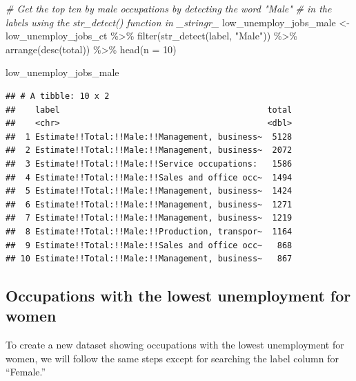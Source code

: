 \documentclass[
  krantz2]{krantz}
\makeatletter
\newenvironment{Shaded}{\begin{snugshade}}{\end{snugshade}}
\newcommand{\AttributeTok}[1]{\textcolor[rgb]{0.61,0.61,0.61}{#1}}
\newcommand{\CommentTok}[1]{\textcolor[rgb]{0.37,0.37,0.37}{\textit{#1}}}
\newcommand{\DecValTok}[1]{\textcolor[rgb]{0.06,0.06,0.06}{#1}}
\newcommand{\FunctionTok}[1]{\textcolor[rgb]{0,0,0}{#1}}
\newcommand{\NormalTok}[1]{#1}
\newcommand{\OtherTok}[1]{\textcolor[rgb]{0.37,0.37,0.37}{#1}}
\newcommand{\SpecialCharTok}[1]{\textcolor[rgb]{0,0,0}{#1}}
\newcommand{\StringTok}[1]{\textcolor[rgb]{0.5,0.5,0.5}{#1}}
\newenvironment{kframe}{%
\medskip{}
\setlength{\fboxsep}{.8em}
 \def\at@end@of@kframe{}%
 \ifinner\ifhmode%
  \def\at@end@of@kframe{\end{minipage}}%
  \begin{minipage}{\columnwidth}%
 \fi\fi%
 \def\FrameCommand##1{\hskip\@totalleftmargin \hskip-\fboxsep
 \colorbox{shadecolor}{##1}\hskip-\fboxsep
     \hskip-\linewidth \hskip-\@totalleftmargin \hskip\columnwidth}%
 \MakeFramed {\advance\hsize-\width
   \@totalleftmargin\z@ \linewidth\hsize
   \@setminipage}}%
 {\par\unskip\endMakeFramed%
 \at@end@of@kframe}
\renewenvironment{Shaded}{\begin{kframe}}{\end{kframe}}
\makeatother
\begin{document}
\begin{Shaded}
\begin{Highlighting}[]
\CommentTok{\# Get the top ten by male occupations by detecting the word "Male"}
\CommentTok{\# in the labels using the \textasciigrave{}str\_detect()\textasciigrave{} function in \_stringr\_}
\NormalTok{low\_unemploy\_jobs\_male }\OtherTok{\textless{}{-}}\NormalTok{ low\_unemploy\_jobs\_ct }\SpecialCharTok{\%\textgreater{}\%}
  \FunctionTok{filter}\NormalTok{(}\FunctionTok{str\_detect}\NormalTok{(label, }\StringTok{"Male"}\NormalTok{)) }\SpecialCharTok{\%\textgreater{}\%}
  \FunctionTok{arrange}\NormalTok{(}\FunctionTok{desc}\NormalTok{(total)) }\SpecialCharTok{\%\textgreater{}\%}
  \FunctionTok{head}\NormalTok{(}\AttributeTok{n =} \DecValTok{10}\NormalTok{)}

\NormalTok{low\_unemploy\_jobs\_male}
\end{Highlighting}
\end{Shaded}

\begin{verbatim}
## # A tibble: 10 x 2
##    label                                          total
##    <chr>                                          <dbl>
##  1 Estimate!!Total:!!Male:!!Management, business~  5128
##  2 Estimate!!Total:!!Male:!!Management, business~  2072
##  3 Estimate!!Total:!!Male:!!Service occupations:   1586
##  4 Estimate!!Total:!!Male:!!Sales and office occ~  1494
##  5 Estimate!!Total:!!Male:!!Management, business~  1424
##  6 Estimate!!Total:!!Male:!!Management, business~  1271
##  7 Estimate!!Total:!!Male:!!Management, business~  1219
##  8 Estimate!!Total:!!Male:!!Production, transpor~  1164
##  9 Estimate!!Total:!!Male:!!Sales and office occ~   868
## 10 Estimate!!Total:!!Male:!!Management, business~   867
\end{verbatim}

\hypertarget{occupations-with-the-lowest-unemployment-for-women}{%
\subsection{Occupations with the lowest unemployment for women}\label{occupations-with-the-lowest-unemployment-for-women}}

To create a new dataset showing occupations with the lowest unemployment for women, we will follow the same steps except for searching the label column for ``Female.''
\end{document}
